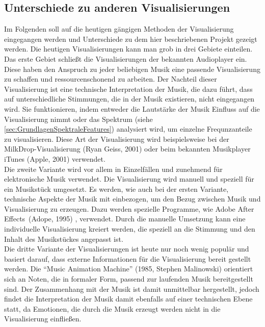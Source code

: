 \documentclass[11pt,a4paper]{article}
\begin{document}
\subsection{Unterschiede zu anderen Visualisierungen}
Im Folgenden soll auf die heutigen gängigen Methoden der Visualisierung eingegangen werden und Unterschiede zu dem hier beschriebenen Projekt gezeigt werden. Die heutigen Visualisierungen kann man grob in drei Gebiete einteilen.\\
Das erste Gebiet schließt die Visualisierungen der bekannten Audioplayer ein. Diese haben den Anspruch zu jeder beliebigen Musik eine passende Visualisierung zu schaffen und res­sour­cen­scho­nend zu arbeiten. Der Nachteil dieser Visualisierung ist eine technische Interpretation der Musik, die dazu führt, dass auf unterschiedliche Stimmungen, die in der Musik existieren, nicht eingegangen wird. Sie funktionieren, indem entweder die Lautstärke der Musik Einfluss auf die Visualisierung nimmt oder das Spektrum (siehe \ref{sec:GrundlagenSpektraleFeatures}) analysiert wird, um einzelne Frequnzanteile zu visualisieren. Diese Art der Visualisierung wird beispielsweise bei der MilkDrop-Visualisierung (Ryan Geiss, 2001) oder beim bekannten Musikplayer iTunes (Apple, 2001)\cite{appleITunes} verwendet.\\
Die zweite Variante wird vor allem in Einzelfällen und zunehmend für elektronische Musik verwendet. Die Visualisierung wird manuell und speziell für ein Musikstück umgesetzt. Es werden, wie auch bei der ersten Variante, technische Aspekte der Musik mit einbezogen, um den Bezug zwischen Musik und Visualisierung zu erzeugen. Dazu werden spezielle Programme, wie \glqq Adobe After Effects\grqq\ (Adope, 1995) \cite{adobeAfterEffects}, verwendet. Durch die manuelle Umsetzung kann eine individuelle Visualisierung kreiert werden, die speziell an die Stimmung und den Inhalt des Musikstückes angepasst ist.\\
Die dritte Variante der Visualisierungen ist heute nur noch wenig populär und basiert darauf, dass externe Informationen für die Visualisierung bereit gestellt werden. Die ``Music Animation Machine'' (1985, Stephen Malinowski) \cite{MusikAnimationMachine} orientiert sich an Noten, die in formaler Form, passend zur laufenden Musik bereitgestellt sind. Der Zusammenhang mit der Musik ist damit unmittelbar hergestellt, jedoch findet die Interpretation der Musik damit ebenfalls auf einer technischen Ebene statt, da Emotionen, die durch die Musik erzeugt werden nicht in die Visualisierung einfließen.
\end{document}
